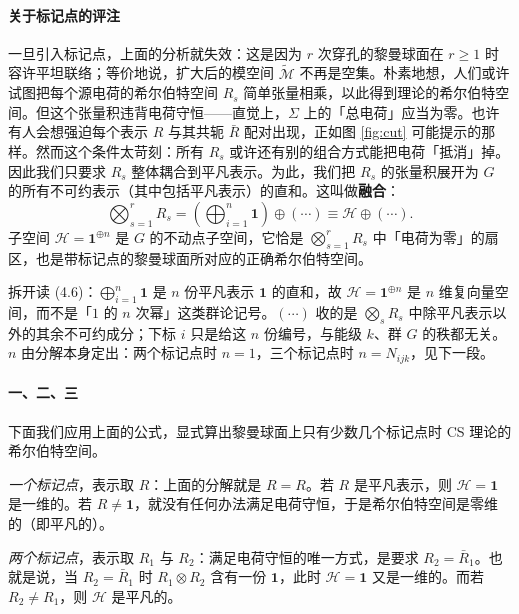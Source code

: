 \paragraph{关于标记点的评注}
一旦引入标记点，上面的分析就失效：这是因为 $r$ 次穿孔的黎曼球面在 $r\ge1$ 时容许平坦联络；等价地说，扩大后的模空间 $\widetilde{\mathcal{M}}$ 不再是空集。朴素地想，人们或许试图把每个源电荷的希尔伯特空间 $R_s$ 简单张量相乘，以此得到理论的希尔伯特空间。但这个张量积违背电荷守恒——直觉上，$\Sigma$ 上的「总电荷」应当为零。也许有人会想强迫每个表示 $R$ 与其共轭 $\bar R$ 配对出现，正如图 \ref{fig:cut} 可能提示的那样。然而这个条件太苛刻：所有 $R_s$ 或许还有别的组合方式能把电荷「抵消」掉。因此我们只要求 $R_s$ 整体耦合到平凡表示。为此，我们把 $R_s$ 的张量积展开为 $G$ 的所有不可约表示（其中包括平凡表示）的直和。这叫做\textbf{融合}：
\begin{equation}\tag{4.6}\label{eq:4.6}
  \bigotimes_{s=1}^{r} R_s = \left(\bigoplus_{i=1}^{n}\mathbf{1}\right)\oplus(\cdots)\equiv\mathcal{H}\oplus(\cdots).
\end{equation}
子空间 $\mathcal{H}=\mathbf{1}^{\oplus n}$ 是 $G$ 的不动点子空间，它恰是 $\bigotimes_{s=1}^{r}R_s$ 中「电荷为零」的扇区，也是带标记点的黎曼球面所对应的正确希尔伯特空间。

\begin{yizhu}[易错点]
拆开读 (4.6)：$\bigoplus_{i=1}^{n}\mathbf{1}$ 是 $n$ 份平凡表示 $\mathbf{1}$ 的直和，故 $\mathcal{H}=\mathbf{1}^{\oplus n}$ 是 $n$ 维复向量空间，而不是「$1$ 的 $n$ 次幂」这类群论记号。$(\cdots)$ 收的是 $\bigotimes_s R_s$ 中除平凡表示以外的其余不可约成分；下标 $i$ 只是给这 $n$ 份编号，与能级 $k$、群 $G$ 的秩都无关。$n$ 由分解本身定出：两个标记点时 $n=1$，三个标记点时 $n=N_{ijk}$，见下一段。
\end{yizhu}

\paragraph{一、二、三}
下面我们应用上面的公式，显式算出黎曼球面上只有少数几个标记点时 CS 理论的希尔伯特空间。

\emph{一个标记点}，表示取 $R$：上面的分解就是 $R=R$。若 $R$ 是平凡表示，则 $\mathcal{H}=\mathbf{1}$ 是一维的。若 $R\ne\mathbf{1}$，就没有任何办法满足电荷守恒，于是希尔伯特空间是零维的（即平凡的）。

\emph{两个标记点}，表示取 $R_1$ 与 $R_2$：满足电荷守恒的唯一方式，是要求 $R_2=\bar R_1$。也就是说，当 $R_2=\bar R_1$ 时 $R_1\otimes R_2$ 含有一份 $\mathbf{1}$，此时 $\mathcal{H}=\mathbf{1}$ 又是一维的。而若 $R_2\ne R_1$，则 $\mathcal{H}$ 是平凡的。

